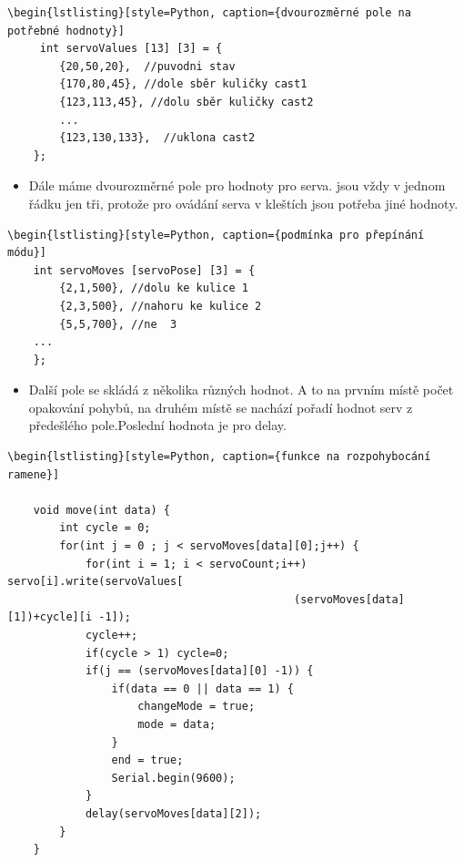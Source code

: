 \documentclass[12pt, a4paper,
twoside,        %
openright
]{report}
\begin{document}
{\begin{itemize}
	
\end{itemize}
	
\begin{lstlisting}[style=Python, caption={dvourozměrné pole na potřebné hodnoty}]
	\begin{lstlisting}[style=Python, caption={dvourozměrné pole na potřebné hodnoty}]
	 int servoValues [13] [3] = {
		{20,50,20},  //puvodni stav 
		{170,80,45}, //dole sběr kuličky cast1
		{123,113,45}, //dolu sběr kuličky cast2
		...
		{123,130,133},  //uklona cast2
	};
		\end{lstlisting}
		
\begin{itemize}
	\item Dále máme dvourozměrné pole pro hodnoty pro serva. jsou vždy v jednom řádku jen tři, protože pro ovádání serva v kleštích jsou potřeba jiné hodnoty.
			
	\end{itemize}
	
\begin{lstlisting}[style=Python, caption={další pole pro }]
	\begin{lstlisting}[style=Python, caption={podmínka pro přepínání módu}]
	int servoMoves [servoPose] [3] = {
		{2,1,500}, //dolu ke kulice 1
		{2,3,500}, //nahoru ke kulice 2
		{5,5,700}, //ne  3
	...
	};	
	\end{lstlisting}
	
	\begin{itemize}
		\item Další pole se skládá z několika různých hodnot. A to na prvním místě počet opakování pohybů, na druhém místě se nachází pořadí hodnot serv z předešlého pole.Poslední hodnota je pro delay.
		
	\end{itemize}

\begin{lstlisting}[style=Python, caption={funkce na rozpohybocání ramene}]
	\begin{lstlisting}[style=Python, caption={funkce na rozpohybocání ramene}]
	
	void move(int data) {
		int cycle = 0;
		for(int j = 0 ; j < servoMoves[data][0];j++) {
			for(int i = 1; i < servoCount;i++) servo[i].write(servoValues[
											(servoMoves[data][1])+cycle][i -1]);
			cycle++;
			if(cycle > 1) cycle=0;
			if(j == (servoMoves[data][0] -1)) {
				if(data == 0 || data == 1) {
					changeMode = true;
					mode = data;
				}
				end = true;
				Serial.begin(9600);
			}
			delay(servoMoves[data][2]);
		}
	}
	

\end{lstlisting}}
\end{document}
